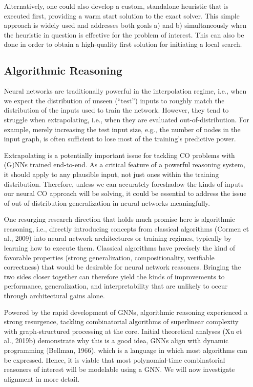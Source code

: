 \documentclass[10pt]{book}
\begin{document}
Alternatively, one could also develop a custom, standalone heuristic that is executed first, providing a warm start solution to the exact solver. This simple approach is widely used and addresses both goals a) and b) simultaneously when the heuristic in question is effective for the problem of interest. This can also be done in order to obtain a high-quality first solution for initiating a local search.

\subsection{Algorithmic Reasoning}

Neural networks are traditionally powerful in the interpolation regime, i.e., when we expect the distribution of unseen (``test'') inputs to roughly match the distribution of the inputs used to train the network. However, they tend to struggle when extrapolating, i.e., when they are evaluated out-of-distribution. For example, merely increasing the test input size, e.g., the number of nodes in the input graph, is often sufficient to lose most of the training's predictive power.

Extrapolating is a potentially important issue for tackling CO problems with (G)NNs trained end-to-end. As a critical feature of a powerful reasoning system, it should apply to any plausible input, not just ones within the training distribution. Therefore, unless we can accurately foreshadow the kinds of inputs our neural CO approach will be solving, it could be essential to address the issue of out-of-distribution generalization in neural networks meaningfully.

One resurging research direction that holds much promise here is algorithmic reasoning, i.e., directly introducing concepts from classical algorithms (Cormen et al., 2009) into neural network architectures or training regimes, typically by learning how to execute them. Classical algorithms have precisely the kind of favorable properties (strong generalization, compositionality, verifiable correctness) that would be desirable for neural network reasoners. Bringing the two sides closer together can therefore yield the kinds of improvements to performance, generalization, and interpretability that are unlikely to occur through architectural gains alone.

Powered by the rapid development of GNNs, algorithmic reasoning experienced a strong resurgence, tackling combinatorial algorithms of superlinear complexity with graph-structured processing at the core. Initial theoretical analyses (Xu et al., 2019b) demonstrate why this is a good idea, GNNs align with dynamic programming (Bellman, 1966), which is a language in which most algorithms can be expressed. Hence, it is viable that most polynomial-time combinatorial reasoners of interest will be modelable using a GNN. We will now investigate alignment in more detail.
\end{document}
